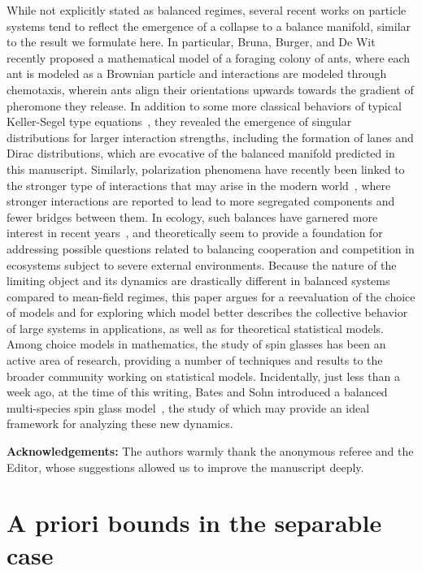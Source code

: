 \documentclass[onefignum,onetabnum]{siamart190516}
\newcommand{\1}{\mathbbm{1}}
\newcommand{\review}[1]{\textcolor{midblue}{ #1}}
\renewcommand{\review}[1]{{ #1}}
\begin{document}
\review{While not explicitly stated as balanced regimes, several recent works on particle systems tend to reflect the emergence of a collapse to a balance manifold, similar to the result we formulate here. In particular, Bruna, Burger, and De Wit~\cite{bruna2025lane} recently proposed a mathematical model of a foraging colony of ants, where each ant is modeled as a Brownian particle and interactions are modeled through chemotaxis, wherein ants align their orientations upwards towards the gradient of pheromone they release. In addition to some more classical behaviors of typical Keller-Segel type equations~\cite{arumugam2021keller}, they revealed the emergence of singular distributions for larger interaction strengths, including the formation of lanes and Dirac distributions, which are evocative of the balanced manifold predicted in this manuscript. Similarly, polarization phenomena have recently been linked to the stronger type of interactions that may arise in the modern world~\cite{stella2019influence}, where stronger interactions are reported to lead to more segregated components and fewer bridges between them. In ecology, such balances have garnered more interest in recent years~\cite{qian2020balance,neutel2014interaction,mccann1998weak,brooker1998balance}, and theoretically seem to provide a foundation for addressing possible questions related to balancing cooperation and competition in ecosystems subject to severe external environments.  Because the nature of the limiting object and its dynamics are drastically different in balanced systems compared to mean-field regimes, this paper argues for a reevaluation of the choice of models and for exploring which model better describes the collective behavior of large systems in applications, as well as for theoretical statistical models. Among choice models in mathematics, the study of spin glasses has been an active area of research, providing a number of techniques and results to the broader community working on statistical models. Incidentally, just less than a week ago, at the time of this writing, Bates and Sohn introduced a balanced multi-species spin glass model~\cite{bates2025balanced}, the study of which may provide an ideal framework for analyzing these new dynamics. }

{\bf Acknowledgements:} The authors warmly thank the anonymous referee and the Editor, whose suggestions allowed us to improve the manuscript deeply. 

\newpage
\appendix

\section{A priori bounds in the separable case}
\label{sec:priori}
\end{document}
